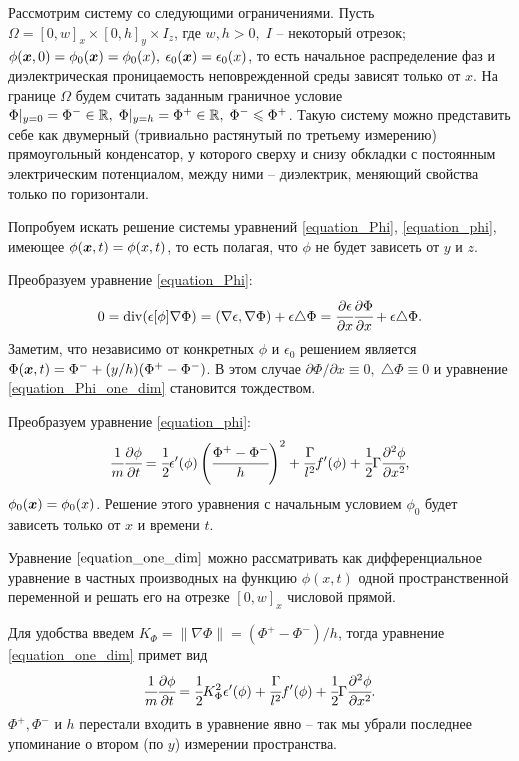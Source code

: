 Рассмотрим систему со следующими ограничениями. Пусть $\Omega = [0, w]_x \times [0, h]_y \times I_z$, где $w, h > 0, \; I$ -- некоторый отрезок; $\phi({\boldsymbol{x}}, 0) = \phi_0({\boldsymbol{x}}) = \phi_0(x),$ $\epsilon_0({\boldsymbol{x}}) = \epsilon_0(x)$, то есть начальное распределение фаз и диэлектрическая проницаемость неповрежденной среды зависят только от $x$. На границе $\Omega$ будем считать заданным граничное условие $\Phi|_{y = 0} = \Phi^- \in {\mathbb{R}}, \; \Phi|_{y = h} = \Phi^+ \in {\mathbb{R}}, \; \Phi^- \leqslant \Phi^+$. Такую систему можно представить себе как двумерный (тривиально растянутый по третьему измерению) прямоугольный конденсатор, у которого сверху и снизу обкладки с постоянным электрическим потенциалом, между ними -- диэлектрик, меняющий свойства только по горизонтали.

Попробуем искать решение системы уравнений \eqref{equation_Phi}, \eqref{equation_phi}, имеющее $\phi({\boldsymbol{x}}, t) = \phi(x, t)$, то есть полагая, что $\phi$ не будет зависеть от $y$ и $z$.

Преобразуем уравнение \eqref{equation_Phi}:
\begin{equation}
    0 = \operatorname{div}(\epsilon[\phi] \nabla \Phi) = (\nabla \epsilon, \nabla \Phi) + \epsilon \triangle \Phi = \cfrac{\partial \epsilon}{\partial x} \cfrac{\partial \Phi}{\partial x} + \epsilon \triangle \Phi \text{.}
    \label{equation_Phi_one_dim}
\end{equation}
Заметим, что независимо от конкретных $\phi$ и $\epsilon_0$ решением является $\Phi({\boldsymbol{x}}, t) = \Phi^- + (y/h)(\Phi^+ - \Phi^-)$. В этом случае $\partial \Phi/\partial x \equiv 0, \; \triangle \Phi \equiv 0$ и уравнение \eqref{equation_Phi_one_dim} становится тождеством.

Преобразуем уравнение \eqref{equation_phi}:
\begin{equation}
    \cfrac{1}{m} \cfrac{\partial \phi}{\partial t} = \cfrac{1}{2} \epsilon'(\phi) \left( \cfrac{\Phi^+ - \Phi^-}{h} \right)^2 + \cfrac{\Gamma}{l^2} f'(\phi) + \cfrac{1}{2} \Gamma \cfrac{\partial^2 \phi}{\partial x^2} \text{,}
    \label{equation_one_dim}
\end{equation}
$\phi_0({\boldsymbol{x}}) = \phi_0(x)$. Решение этого уравнения с начальным условием $\phi_0$ будет зависеть только от $x$ и времени $t$.

Уравнение $\eqref{equation_one_dim}$ можно рассматривать как дифференциальное уравнение в частных производных на функцию $\phi(x, t)$ одной пространственной переменной и решать его на отрезке $[0, w]_x$ числовой прямой.

Для удобства введем $K_\Phi = \|\nabla \Phi\| = (\Phi^+ - \Phi^-)/h$, тогда уравнение \eqref{equation_one_dim} примет вид
\begin{equation}
    \cfrac{1}{m} \cfrac{\partial \phi}{\partial t} = \cfrac{1}{2} K_\Phi^2 \epsilon'(\phi) + \cfrac{\Gamma}{l^2} f'(\phi) + \cfrac{1}{2} \Gamma \cfrac{\partial^2 \phi}{\partial x^2} \text{.}
    \label{equation_one_dim_simpler}
\end{equation}
$\Phi^+, \Phi^-$ и $h$ перестали входить в уравнение явно -- так мы убрали последнее упоминание о втором (по $y$) измерении пространства.

